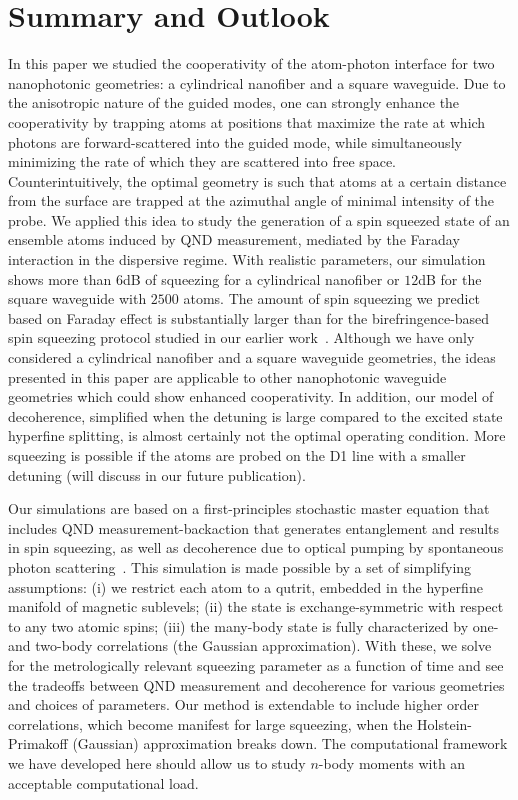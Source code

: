 \documentclass[preprint,aps,pra,onecolumn,superscriptaddress]{revtex4-1} %
\begin{document}
\section{Summary and Outlook}
In this paper we studied the cooperativity of the atom-photon interface for two nanophotonic geometries: a cylindrical nanofiber and a square waveguide.  Due to the anisotropic nature of the guided modes, one can strongly enhance the cooperativity by trapping atoms at positions that maximize the rate at which photons are forward-scattered  into the guided mode, while simultaneously minimizing the rate of which they are scattered into free space.  Counterintuitively, the optimal geometry is such that atoms at a certain distance from the surface are trapped at the azimuthal angle of minimal intensity of the probe.  We applied this idea to study the generation of a spin squeezed state of an ensemble atoms induced by QND measurement, mediated by the Faraday interaction in the dispersive regime. 
With realistic parameters, our simulation shows more than $ 6 $dB of squeezing for a cylindrical nanofiber or $ 12 $dB for the square waveguide with $ 2500 $ atoms. The amount of spin squeezing we predict based on Faraday effect is substantially larger than for the birefringence-based spin squeezing protocol studied in our earlier work~\cite{Qi2016}.  Although we have only considered a cylindrical nanofiber and a square waveguide geometries, the ideas presented in this paper are applicable to other nanophotonic waveguide geometries which could show enhanced cooperativity.  In addition, our model of decoherence, simplified when the detuning is large compared to the excited state hyperfine splitting, is almost certainly not the optimal operating condition. More squeezing is possible if the atoms are probed on the D1 line with a smaller detuning (will discuss in our future publication).

Our simulations are based on a first-principles stochastic master equation that includes QND measurement-backaction that generates entanglement and results in spin squeezing, as well as decoherence due to optical pumping by spontaneous photon scattering~\cite{Norris2014, Baragiola2014, Qi2016}. This simulation is made possible by a set of simplifying assumptions: (i) we restrict each atom to a qutrit, embedded in the hyperfine manifold of magnetic sublevels; (ii) the state is exchange-symmetric with respect to any two atomic spins; (iii) the many-body state is fully characterized by one- and two-body correlations (the Gaussian approximation).   With these, we solve for the metrologically relevant squeezing parameter as a function of time and see the tradeoffs between QND measurement and decoherence for various geometries and choices of parameters.  Our method is extendable to include higher order correlations, which become manifest for large squeezing, when the Holstein-Primakoff (Gaussian) approximation breaks down.  The computational framework we have developed here should allow us to study $n$-body moments with an acceptable computational load. 
\end{document}
